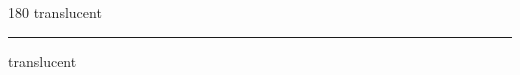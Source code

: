 
\begin{frame}
\begin{center}
\begin{turn}{180}
{\fontsize{2.5cm}{1em}\selectfont translucent}
\end{turn}
\vspace{1em}\par  
\hrule
\vspace{1em}\par  
{\fontsize{2.5cm}{1em}\selectfont translucent}
\end{center}
\end{frame}
